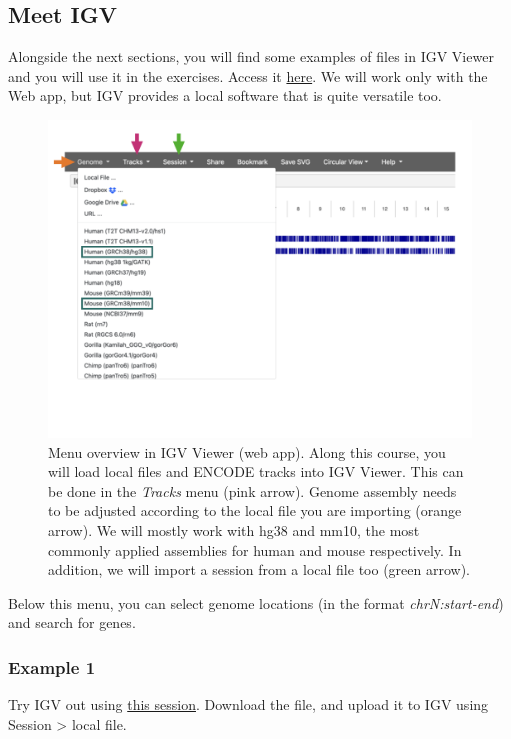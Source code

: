 \documentclass[
]{book}
\begin{document}
\hypertarget{meet-igv}{%
\subsection{Meet IGV}\label{meet-igv}}

Alongside the next sections, you will find some examples of files in IGV Viewer and you will use it in the exercises. Access it \href{https://igv.org/app/}{here}. We will work only with the Web app, but IGV provides a local software that is quite versatile too.

\begin{figure}
\centering
\includegraphics{figures/IGVintro.png}
\caption{Menu overview in IGV Viewer (web app). Along this course, you will load local files and ENCODE tracks into IGV Viewer. This can be done in the \emph{Tracks} menu (pink arrow). Genome assembly needs to be adjusted according to the local file you are importing (orange arrow). We will mostly work with hg38 and mm10, the most commonly applied assemblies for human and mouse respectively. In addition, we will import a session from a local file too (green arrow).}
\end{figure}

Below this menu, you can select genome locations (in the format \emph{chrN:start-end}) and search for genes.

\hypertarget{example-1}{%
\subsubsection{Example 1}\label{example-1}}

Try IGV out using \href{IGV_sessions/heart_Histones.json}{this session}. Download the file, and upload it to IGV using Session \textgreater{} local file.
\end{document}
